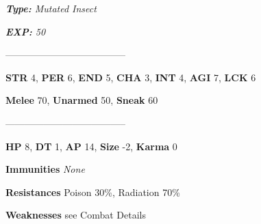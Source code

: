\documentclass[11pt,a4paper,twocolumn]{book}
\begin{document}
	\noindent
	\emph{\textbf{Type:} Mutated Insect}
	
	\noindent
	\emph{\textbf{EXP:} 50}
	
%		
%	
%		

		--------------------------------------
	
	\noindent
	\textbf{STR} 4, \textbf{PER} 6, \textbf{END} 5, \textbf{CHA} 3, \textbf{INT} 4, \textbf{AGI} 7, \textbf{LCK} 6
	
	\noindent
	\textbf{Melee} 70, \textbf{Unarmed} 50, \textbf{Sneak} 60
	
	--------------------------------------
	
	\noindent
	\textbf{HP} 8, \textbf{DT} 1, \textbf{AP} 14, \textbf{Size} -2, \textbf{Karma} 0
	
	
	\noindent
	\textbf{Immunities} \emph{None}
	
	\noindent
	\textbf{Resistances} Poison 30\%, Radiation 70\%
	
	\noindent
	\textbf{Weaknesses} see Combat Details %
	
\end{document}
